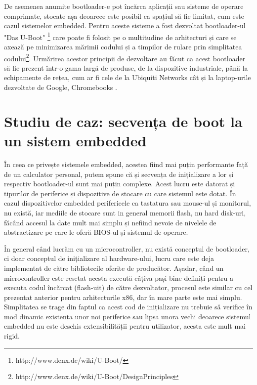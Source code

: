 \documentclass[12pt,a4paper,titlepage]{report}
\begin{document}
De asemenea anumite bootloader-e pot încărca aplicații sau sisteme de operare comprimate, stocate așa deoarece este posibil ca spațiul să fie limitat, cum este cazul sistemelor embedded. Pentru aceste sisteme a fost dezvoltat bootloader-ul "Das U-Boot" \footnote{http://www.denx.de/wiki/U-Boot/} care poate fi folosit pe o multitudine de arhitecturi și care se axează pe minimizarea mărimii codului și a timpilor de rulare prin simplitatea codului\footnote{http://www.denx.de/wiki/U-Boot/DesignPrinciples}. Urmărirea acestor principii de dezvoltare au făcut ca acest bootloader să fie prezent într-o gama largă  de produse, de la dispozitive industriale, până la echipamente de rețea, cum ar fi cele de la Ubiquiti Networks cât și la laptop-urile dezvoltate de Google, Chromebooks \cite{wikiUboot}.

\section{Studiu de caz: secvența de boot la un sistem embedded}

În ceea ce privește sistemele embedded, acestea fiind mai puțin performante față de un calculator personal, putem spune că și secvența de inițializare a lor și respectiv bootloader-ul sunt mai puțin complexe.
Acest lucru este datorat și tipurilor de periferice și dispozitive de stocare cu care sistemul este dotat. În cazul dispozitivelor embedded perifericele ca tastatura sau mouse-ul și monitorul, nu există, iar mediile de stocare sunt in general memorii flash, nu hard disk-uri, făcând accesul la date mult mai simplu și nefiind nevoie de nivelele de abstractizare pe care le oferă BIOS-ul și sistemul de operare.

În general când lucrăm cu un microcontroller, nu există conceptul de bootloader, ci doar conceptul de inițializare al hardware-ului, lucru care este deja implementat de către bibliotecile oferite de producător.
Așadar, când un microcontroller este resetat acesta execută câțiva pași bine definiți pentru a executa codul încărcat (flash-uit) de către dezvoltator, procesul este similar cu cel prezentat anterior pentru arhitecturile x86, dar în mare parte este mai simplu. Simplitatea se trage din faptul ca acest cod de inițializare nu trebuie să verifice în mod dinamic existența unor noi periferice sau lipsa unora vechi deoarece sistemul embedded nu este deschis extensibilității pentru utilizator, acesta este mult mai rigid.
\end{document}

